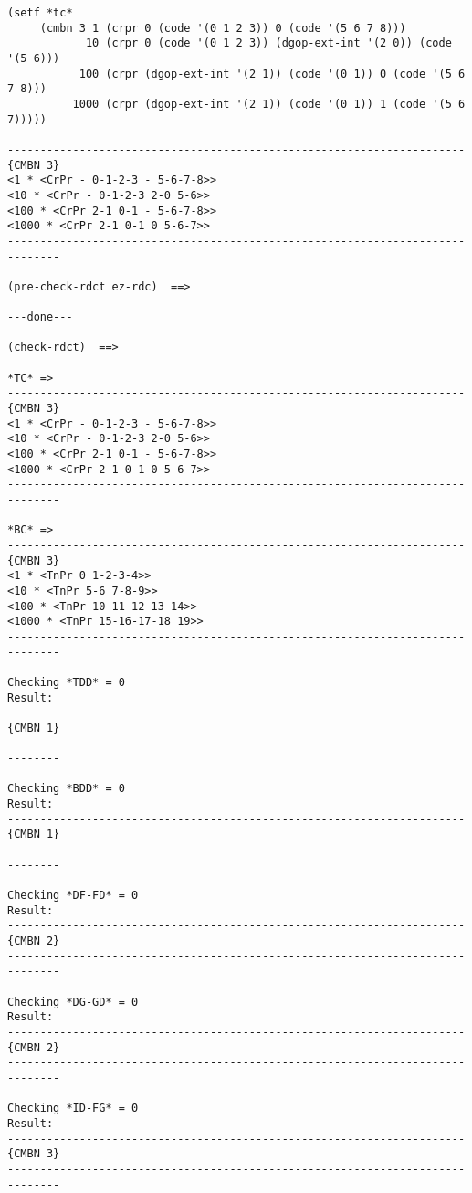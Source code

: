 {\footnotesize\begin{verbatim}
(setf *tc* 
     (cmbn 3 1 (crpr 0 (code '(0 1 2 3)) 0 (code '(5 6 7 8)))
            10 (crpr 0 (code '(0 1 2 3)) (dgop-ext-int '(2 0)) (code '(5 6)))
           100 (crpr (dgop-ext-int '(2 1)) (code '(0 1)) 0 (code '(5 6 7 8)))
          1000 (crpr (dgop-ext-int '(2 1)) (code '(0 1)) 1 (code '(5 6 7)))))

----------------------------------------------------------------------{CMBN 3}
<1 * <CrPr - 0-1-2-3 - 5-6-7-8>>
<10 * <CrPr - 0-1-2-3 2-0 5-6>>
<100 * <CrPr 2-1 0-1 - 5-6-7-8>>
<1000 * <CrPr 2-1 0-1 0 5-6-7>>
------------------------------------------------------------------------------

(pre-check-rdct ez-rdc)  ==>

---done---

(check-rdct)  ==>

*TC* => 
----------------------------------------------------------------------{CMBN 3}
<1 * <CrPr - 0-1-2-3 - 5-6-7-8>>
<10 * <CrPr - 0-1-2-3 2-0 5-6>>
<100 * <CrPr 2-1 0-1 - 5-6-7-8>>
<1000 * <CrPr 2-1 0-1 0 5-6-7>>
------------------------------------------------------------------------------

*BC* => 
----------------------------------------------------------------------{CMBN 3}
<1 * <TnPr 0 1-2-3-4>>
<10 * <TnPr 5-6 7-8-9>>
<100 * <TnPr 10-11-12 13-14>>
<1000 * <TnPr 15-16-17-18 19>>
------------------------------------------------------------------------------

Checking *TDD* = 0
Result: 
----------------------------------------------------------------------{CMBN 1}
------------------------------------------------------------------------------

Checking *BDD* = 0
Result: 
----------------------------------------------------------------------{CMBN 1}
------------------------------------------------------------------------------

Checking *DF-FD* = 0
Result: 
----------------------------------------------------------------------{CMBN 2}
------------------------------------------------------------------------------

Checking *DG-GD* = 0
Result: 
----------------------------------------------------------------------{CMBN 2}
------------------------------------------------------------------------------

Checking *ID-FG* = 0
Result: 
----------------------------------------------------------------------{CMBN 3}
------------------------------------------------------------------------------


\end{verbatim}}
